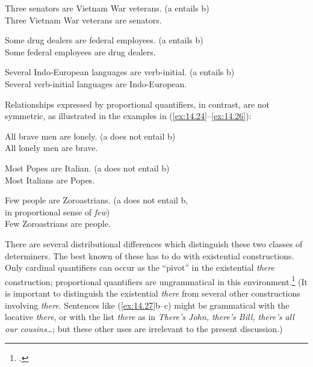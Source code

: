 \ea \label{ex:14.21}
\ea Three senators are Vietnam War veterans. \hfill  (a entails b)\\
\ex Three Vietnam War veterans are senators.
\z \z

\ea \label{ex:14.22}
\ea Some drug dealers are federal employees. \hfill  (a entails b)\\
\ex Some federal employees are drug dealers.
\z \z

\ea \label{ex:14.23}
\ea Several Indo-European languages are verb-initial. \hfill  (a entails b)\\
\ex Several verb-initial languages are Indo-European.
                       \z
\z


Relationships expressed by proportional quantifiers, in contrast, are not symmetric, as illustrated in the examples in (\ref{ex:14.24}--\ref{ex:14.26}):


\ea \label{ex:14.24}
\ea All brave men are lonely. \hfill  (a does not entail b)\\
\ex All lonely men are brave.
                       \z
\z

\ea \label{ex:14.25}
\ea  Most Popes are {Italian}.  \hfill  (a does not entail b)\\
\ex Most Italians are Popes.
\z \z

\ea \label{ex:14.26}
\ea Few people are Zoroastrians.  \hfill (a does not entail b, \\
\hfill in proportional sense of \textit{few})\\
\ex Few Zoroastrians are people.
                       \z
\z


There are several distributional differences which distinguish these two classes of determiners. The best known of these has to do with existential constructions. Only cardinal quantifiers can occur as the “pivot” in the existential \textit{there} construction; proportional quantifiers are ungrammatical in this environment.\footnote{\citet{Milsark1977}.} (It is important to distinguish the existential \textit{there} from several other constructions involving \textit{there}. Sentences like (\ref{ex:14.27}b--c) might be grammatical with the locative \textit{there}, or with the list \textit{there} as in \textit{There’s John, there’s Bill, there’s all our cousins…}; but these other uses are irrelevant to the present discussion.)


\ea \label{ex:14.27}
\ea {}
                       \z
\z


